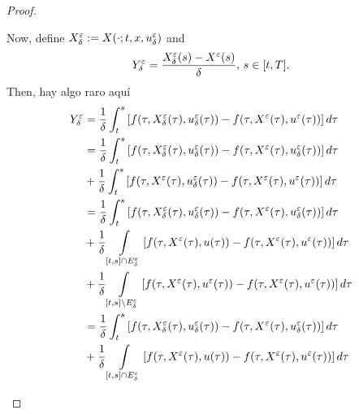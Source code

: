 \begin{proof}
\begin{asparaenum}
        Now, define $X_{\delta}^{\varepsilon} := X(\cdot; t, x, u_{\delta}^{\varepsilon})$ and
        \begin{equation*}
            Y_{\delta}^{\varepsilon} = \dfrac{X_{\delta}^{\varepsilon}(s) - X^{\varepsilon}(s)}{\delta}, \, s \in [t,T].
        \end{equation*}
        Then, hay algo raro aquí
        \begin{align*}
            Y_{\delta}^{\veps} %
            &=  \dfrac{1}{\delta} \int_{t}^{s}\left[f(\tau, X_{\delta}^{\veps}%
                (\tau),u_{\delta}^{\veps}(\tau)) - f(\tau,X^{\veps}(\tau), %
                u^{\veps}(\tau) )\right]d\tau \\
            &=  \dfrac{1}{\delta} \int_{t}^{s}\left[f(\tau, X_{\delta}^{\veps}%
                (\tau), u_{\delta}^{\veps}(\tau)) - f(\tau,X^{\veps}(\tau),%
                u^{\veps}_{\delta}(\tau) )\right]d\tau \\
             &+ \frac{1}{\delta} \int_{t}^{s} \left[f(\tau,X^{\veps}(\tau), %
                u^{\veps}_{\delta}(\tau)) - f(\tau,X^{\veps}(\tau), %
                u^{\veps}(\tau) )\right]d\tau \\
            &=  \dfrac{1}{\delta} \int_{t}^{s}\left[f(\tau, X_{\delta}^{\veps} %
                (\tau), u_{\delta}^{\veps}(\tau)) - f(\tau,X^{\veps}(\tau),%
                u^{\veps}_{\delta}(\tau) )\right]d\tau \\
             &+ \frac{1}{\delta} \int\limits_{[t,s] \cap E_{\delta}^{\veps}} %
                \left[f(\tau,X^{\veps}(\tau), u(\tau)) - f(\tau,X^{\veps}(\tau),%
                u^{\veps}(\tau) )\right]d\tau \\
             &+ \frac{1}{\delta}\int\limits_{[t,s] \setminus E_{\delta}^{\veps}} %
                \left[f(\tau,X^{\veps}(\tau), u^{\veps}(\tau)) - %
                f(\tau,X^{\veps}(\tau),u^{\veps}(\tau) )\right]d\tau \\
            &=  \dfrac{1}{\delta} \int_{t}^{s}\left[f(\tau, X_{\delta}^{\veps} %
                (\tau), u_{\delta}^{\veps}(\tau)) - f(\tau,X^{\veps}(\tau),%
                u^{\veps}_{\delta}(\tau) )\right]d\tau \\
             &+ \frac{1}{\delta} \int\limits_{[t,s] \cap E_{\delta}^{\veps}} %
                \left[f(\tau,X^{\veps}(\tau), u(\tau)) - f(\tau,X^{\veps}(\tau),%
                u^{\veps}(\tau) )\right]d\tau \\

\end{align*}
\end{asparaenum}
\end{proof}
